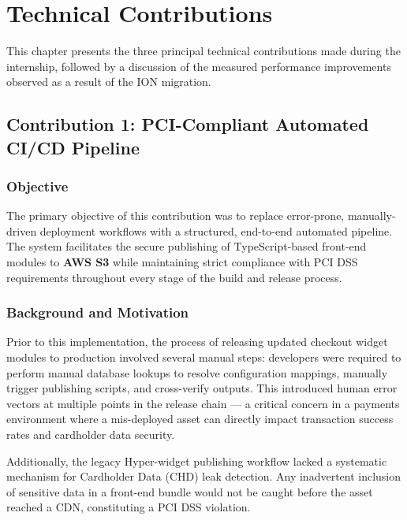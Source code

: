 \chapter{Technical Contributions}\label{TechnicalContributions}

This chapter presents the three principal technical contributions made during the internship, followed by a discussion of the measured performance improvements observed as a result of the ION migration.

\section{Contribution 1: PCI-Compliant Automated CI/CD Pipeline}

\subsection{Objective}

The primary objective of this contribution was to replace error-prone, manually-driven deployment workflows with a structured, end-to-end automated pipeline. The system facilitates the secure publishing of TypeScript-based front-end modules to \textbf{AWS S3} while maintaining strict compliance with PCI DSS requirements throughout every stage of the build and release process.

\subsection{Background and Motivation}

Prior to this implementation, the process of releasing updated checkout widget modules to production involved several manual steps: developers were required to perform manual database lookups to resolve configuration mappings, manually trigger publishing scripts, and cross-verify outputs. This introduced human error vectors at multiple points in the release chain --- a critical concern in a payments environment where a mis-deployed asset can directly impact transaction success rates and cardholder data security.

Additionally, the legacy Hyper-widget publishing workflow lacked a systematic mechanism for Cardholder Data (CHD) leak detection. Any inadvertent inclusion of sensitive data in a front-end bundle would not be caught before the asset reached a CDN, constituting a PCI DSS violation.

